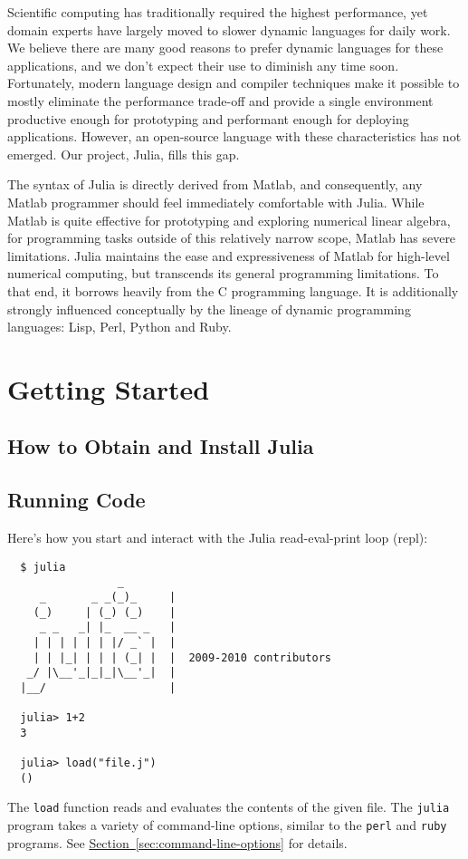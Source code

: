 \documentclass{article}
\title{\thetitle}
\author{
Jeff Bezanson \vspace{0.5em}\\
Stefan Karpinski \vspace{0.5em}\\
Viral Shah \vspace{0.5em}
}
\renewcommand{\sec}[1]{\label{sec:#1}}
\newcommand{\Section}[1]{\hyperref[sec:#1]{Section~\ref*{sec:#1}}}
\begin{document}
\maketitle

Scientific computing has traditionally required the highest performance, yet domain experts have largely moved to slower dynamic languages for daily work.
We believe there are many good reasons to prefer dynamic languages for these applications, and we don't expect their use to diminish any time soon.
Fortunately, modern language design and compiler techniques make it possible to mostly eliminate the performance trade-off and provide a single environment productive enough for prototyping and performant enough for deploying applications.
However, an open-source language with these characteristics has not emerged.
Our project, Julia, fills this gap.

The syntax of Julia is directly derived from Matlab, and consequently, any Matlab programmer should feel immediately comfortable with Julia.
While Matlab is quite effective for prototyping and exploring numerical linear algebra, for programming tasks outside of this relatively narrow scope, Matlab has severe limitations.
Julia maintains the ease and expressiveness of Matlab for high-level numerical computing, but transcends its general programming limitations.
To that end, it borrows heavily from the C programming language.
It is additionally strongly influenced conceptually by the lineage of dynamic programming languages:
Lisp, Perl, Python and Ruby.

\section{Getting Started}
\sec{getting-started}

\subsection{How to Obtain and Install Julia}
\sec{obtaining-and-installing}

\subsection{Running Code}
\sec{running-code}

Here's how you start and interact with the Julia read-eval-print loop (repl):

\begin{verbatim}
  $ julia
                 _      
     _       _ _(_)_     |
    (_)     | (_) (_)    |  
     _ _   _| |_  __ _   |
    | | | | | | |/ _` |  |
    | | |_| | | | (_| |  |  2009-2010 contributors
   _/ |\__'_|_|_|\__'_|  |  
  |__/                   |

  julia> 1+2
  3

  julia> load("file.j")
  ()
\end{verbatim}
The \verb|load| function reads and evaluates the contents of the given file.
The \verb|julia| program takes a variety of command-line options, similar to the \verb|perl| and \verb|ruby| programs.
See \Section{command-line-options} for details.
\end{document}
